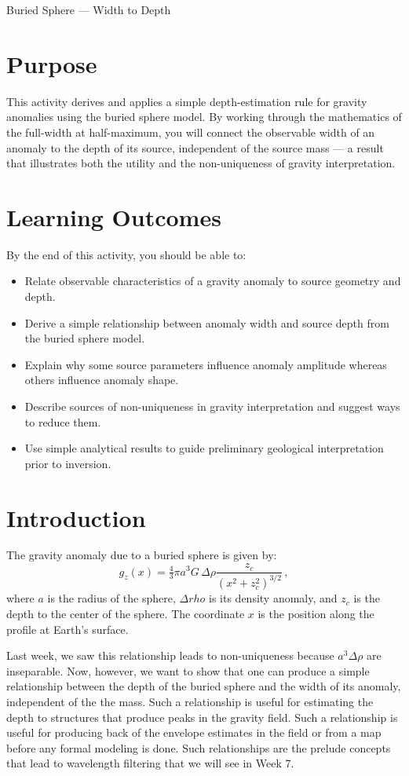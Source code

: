 \begin{activity}{Buried Sphere --- Width to Depth}

\section*{Purpose}

This activity derives and applies a simple depth-estimation rule for gravity anomalies using the buried sphere model. By working through the mathematics of the full-width at half-maximum, you will connect the observable width of an anomaly to the depth of its source, independent of the source mass --- a result that illustrates both the utility and the non-uniqueness of gravity interpretation.

\section*{Learning Outcomes}

By the end of this activity, you should be able to:
\begin{itemize}
\item Relate observable characteristics of a gravity anomaly to source geometry and depth.
\item Derive a simple relationship between anomaly width and source depth from the buried sphere model.
\item Explain why some source parameters influence anomaly amplitude whereas others influence anomaly shape.
\item Describe sources of non-uniqueness in gravity interpretation and suggest ways to reduce them.
\item Use simple analytical results to guide preliminary geological interpretation prior to inversion.
\end{itemize}

\section*{Introduction}
The gravity anomaly due to a buried sphere is given by:
\[
  g_z(x) = \tfrac{4}{3}\pi a^3 G\, \Delta\rho 
  \frac{z_c}{(x^2+z_c^2)^{3/2}}\, ,
\]
where $a$ is the radius of the sphere, $\Delta rho$ is its density anomaly, and $z_c$ is the depth to the center of the sphere.  The coordinate $x$ is the position along the profile at Earth's surface.

Last week, we saw this relationship leads to non-uniqueness because $a^3 \Delta \rho$ are inseparable.  Now, however, we want to show that one can produce a simple relationship between the depth of the buried sphere and the width of its anomaly, independent of the the mass.  Such a relationship is useful for estimating the depth to structures that produce peaks in the gravity field.  Such a relationship is useful for producing back of the envelope estimates in the field or from a map before any formal modeling is done.  Such relationships are the prelude concepts that lead to wavelength filtering that we will see in Week 7.


\end{activity}
